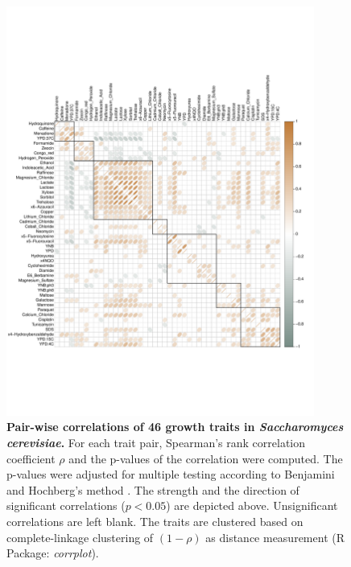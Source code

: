 \begin{figure}[hbtp]
	\centering
	\includegraphics[trim = 0mm 80mm 10mm 80mm, clip, width=0.9\textwidth]{Chapter1/Figures/20170125_correlation_pheno_noNA.pdf}
	\caption[Pair-wise correlations of 46 growth traits in \emph{Saccharomyces cerevisiae}]{\textbf{Pair-wise correlations of 46 growth traits in \emph{Saccharomyces cerevisiae}.} For each trait pair, Spearman's rank correlation coefficient \(\rho\) and the p-values of the correlation were computed. The p-values were adjusted for multiple testing according to Benjamini and Hochberg's method \citep{Benjamini1995}. The strength and the direction of significant correlations (\(p < 0.05\)) are depicted above. Unsignificant correlations are left blank. The traits are clustered based on complete-linkage clustering of \((1-\rho)\) as distance measurement (R Package: \emph{corrplot}).}
 	\label{fig:traitcorrelations}
\end{figure}
 	
